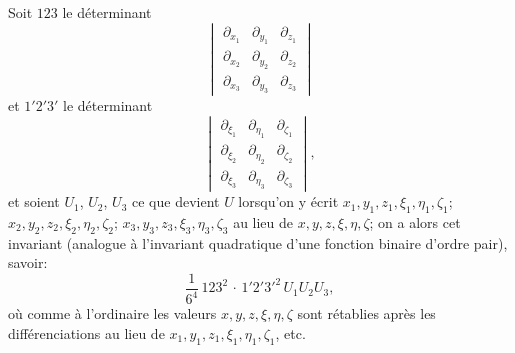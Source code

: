 \documentclass[11pt,a4paper]{book}
\begin{document}
Soit $123$ le d\'{e}terminant
\[
\begin{vmatrix}
\partial_{x_{1}} & \partial_{y_{1}} & \partial_{z_{1}} \\
\partial_{x_{2}} & \partial_{y_{2}} & \partial_{z_{2}} \\
\partial_{x_{3}} & \partial_{y_{3}} & \partial_{z_{3}}
\end{vmatrix}
\]
et $1'2'3'$ le d\'{e}terminant
\[
\begin{vmatrix}
\partial_{\xi_{1}} & \partial_{\eta_{1}} & \partial_{\zeta_{1}} \\
\partial_{\xi_{2}} & \partial_{\eta_{2}} & \partial_{\zeta_{2}} \\
\partial_{\xi_{3}} & \partial_{\eta_{3}} & \partial_{\zeta_{3}}
\end{vmatrix},
\]
et soient $U_{1}$, $U_{2}$, $U_{3}$ ce que devient $U$ lorsqu'on y \'{e}crit
$x_{1},y_{1},z_{1},\xi_{1},\eta_{1},\zeta_{1}$;
$x_{2},y_{2},z_{2},\xi_{2},\eta_{2},\zeta_{2}$;
$x_{3},y_{3},z_{3},\xi_{3},\eta_{3},\zeta_{3}$
au lieu de $x,y,z,\xi,\eta,\zeta$; on a alors cet invariant (analogue \`{a}
l'invariant quadratique d'une fonction binaire d'ordre pair), savoir:
\[\frac{1}{6^{4}}\,123^{2}\,\cdot\,1'2'3'^{2}\,U_{1}U_{2}U_{3},\]
o\`{u} comme \`{a} l'ordinaire les valeurs $x,y,z,\xi,\eta,\zeta$ sont r\'{e}tablies
apr\`{e}s les diff\'{e}renciations au lieu de $x_{1},y_{1},z_{1},\xi_{1},\eta_{1},\zeta_{1}$, etc.
\end{document}
